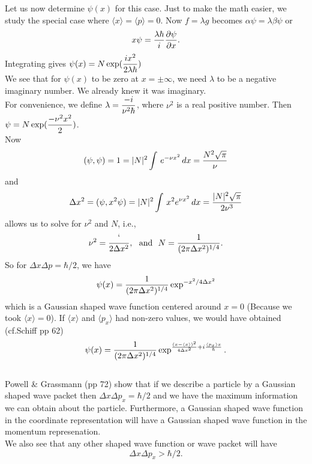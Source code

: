   Let us now determine $\psi(x)$ for this case. Just to make the math easier, we study the special case where $\langle x\rangle   = \langle p\rangle   = 0$. Now $f = \lambda g$ becomes $\alpha \psi = \lambda \beta \psi$ or
   $$x\psi = {\lambda \hbar\over i} {\partial \psi\over \partial x}.$$
   Integrating gives ${\displaystyle \psi(x) = N \exp({ix^2\over 2\lambda \hbar})}$\\
   We see that for $\psi(x)$ to be zero at $x=\pm \infty$, we need $\lambda$ to be a negative imaginary number. We already knew it was imaginary.\\
   For convenience, we define $\lambda = \displaystyle {-i\over \nu^2 \hbar}$, where $\nu^2$ is a real positive number. Then $\displaystyle \psi = N\exp({-\nu^2 x^2\over 2})$. \\
   Now  $$(\psi,\psi) = 1 = |N|^2 \int\, e^{-\nu x^2}\, dx = {N^2\sqrt{\pi}\over \nu}$$ and 
   $$\Delta x^2 = (\psi, x^2\psi) = |N|^2 \int\, x^2 e^{\nu x^2}\, dx = {|N|^2 \sqrt{\pi}\over 2\nu^3}$$
   allows us to solve for $\nu^2$ and $N$, i.e., 
   $$\nu^2 = {`\over 2\Delta x^2},~~\hbox{and}~~N = {1\over (2\pi\Delta x^2)^{1/4} }.$$
   So for $\Delta x \Delta p = \hbar/2$, we have 
   $$\psi(x) = {1\over (2\pi\Delta x^2)^{1/4} }\exp^{-x^2 /4\Delta x^2}$$ which is a Gaussian shaped wave function centered around $x = 0$ (Because we took $\langle x\rangle = 0$). 
   If $\langle x \rangle$ and $\langle p_x\rangle$ had non-zero values, we would have obtained (cf.Schiff pp 62)
   $$\psi(x) = {1\over (2\pi\Delta x^2)^{1/4} }\exp ^{ {(x-\langle x\rangle)^2\over 4 \Delta x^2} + i {\langle p_x\rangle x\over \hbar} }.$$ \\
   Powell \& Grassmann (pp 72) show that if we describe a particle by a Gaussian shaped wave packet then $\Delta x \Delta p_x = \hbar/2$ and we have the maximum information we can obtain about the particle. 
   Furthermore, a Gaussian shaped wave function in the coordinate representation will have a Gaussian shaped wave function in the momentum represenation. \\
   We also see that any other shaped wave function or wave packet will have $$\Delta x\Delta p_x > \hbar/2.$$
   
   